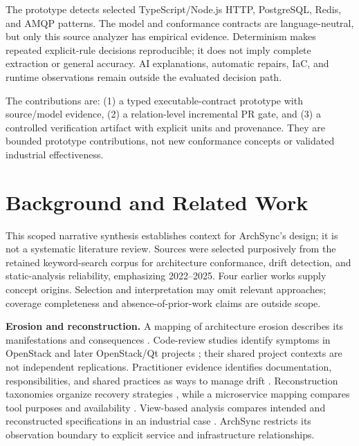 \documentclass[conference]{IEEEtran}
\begin{document}
The prototype detects selected TypeScript/Node.js HTTP, PostgreSQL, Redis, and AMQP patterns. The model and conformance contracts are language-neutral, but only this source analyzer has empirical evidence. Determinism makes repeated explicit-rule decisions reproducible; it does not imply complete extraction or general accuracy. AI explanations, automatic repairs, IaC, and runtime observations remain outside the evaluated decision path.

The contributions are: (1) a typed executable-contract prototype with source/model evidence, (2) a relation-level incremental PR gate, and (3) a controlled verification artifact with explicit units and provenance. They are bounded prototype contributions, not new conformance concepts or validated industrial effectiveness.

\section{Background and Related Work}
This scoped narrative synthesis establishes context for ArchSync's design; it is not a systematic literature review. Sources were selected purposively from the retained keyword-search corpus for architecture conformance, drift detection, and static-analysis reliability, emphasizing 2022--2025. Four earlier works supply concept origins. Selection and interpretation may omit relevant approaches; coverage completeness and absence-of-prior-work claims are outside scope.

\textbf{Erosion and reconstruction.} A mapping of architecture erosion describes its manifestations and consequences \cite{li2022erosion}. Code-review studies identify symptoms in OpenStack and later OpenStack/Qt projects \cite{li2022symptoms,li2023warnings}; their shared project contexts are not independent replications. Practitioner evidence identifies documentation, responsibilities, and shared practices as ways to manage drift \cite{anthony2024drifting}. Reconstruction taxonomies organize recovery strategies \cite{ducasse2009reconstruction,sar2024taxonomy}, while a microservice mapping compares tool purposes and availability \cite{bakhtin2024mapping}. View-based analysis compares intended and reconstructed specifications in an industrial case \cite{uzun2024drift}. ArchSync restricts its observation boundary to explicit service and infrastructure relationships.
\end{document}
